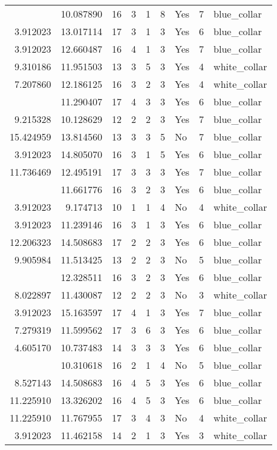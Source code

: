 \documentclass[
]{article}
\begin{document}
\begin{longtable}[t]{rrrrrllrl}
\addlinespace
3.912023 & 10.087890 & 16 & 3 & 1 & 8 & Yes & 7 & blue\_collar\\
3.912023 & 13.017114 & 17 & 3 & 1 & 3 & Yes & 6 & blue\_collar\\
3.912023 & 12.660487 & 16 & 4 & 1 & 3 & Yes & 7 & blue\_collar\\
9.310186 & 11.951503 & 13 & 3 & 5 & 3 & Yes & 4 & white\_collar\\
7.207860 & 12.186125 & 16 & 3 & 2 & 3 & Yes & 4 & white\_collar\\
\addlinespace
8.022897 & 11.290407 & 17 & 4 & 3 & 3 & Yes & 6 & blue\_collar\\
9.215328 & 10.128629 & 12 & 2 & 2 & 3 & Yes & 7 & blue\_collar\\
15.424959 & 13.814560 & 13 & 3 & 3 & 5 & No & 7 & blue\_collar\\
3.912023 & 14.805070 & 16 & 3 & 1 & 5 & Yes & 6 & blue\_collar\\
11.736469 & 12.495191 & 17 & 3 & 3 & 3 & Yes & 7 & blue\_collar\\
\addlinespace
5.521461 & 11.661776 & 16 & 3 & 2 & 3 & Yes & 6 & blue\_collar\\
3.912023 & 9.174713 & 10 & 1 & 1 & 4 & No & 4 & white\_collar\\
3.912023 & 11.239146 & 16 & 3 & 1 & 3 & Yes & 6 & blue\_collar\\
12.206323 & 14.508683 & 17 & 2 & 2 & 3 & Yes & 6 & blue\_collar\\
9.905984 & 11.513425 & 13 & 2 & 2 & 3 & No & 5 & blue\_collar\\
\addlinespace
11.002933 & 12.328511 & 16 & 3 & 2 & 3 & Yes & 6 & blue\_collar\\
8.022897 & 11.430087 & 12 & 2 & 2 & 3 & No & 3 & white\_collar\\
3.912023 & 15.163597 & 17 & 4 & 1 & 3 & Yes & 7 & blue\_collar\\
7.279319 & 11.599562 & 17 & 3 & 6 & 3 & Yes & 6 & blue\_collar\\
4.605170 & 10.737483 & 14 & 3 & 3 & 3 & Yes & 6 & blue\_collar\\
\addlinespace
3.912023 & 10.310618 & 16 & 2 & 1 & 4 & No & 5 & blue\_collar\\
8.527143 & 14.508683 & 16 & 4 & 5 & 3 & Yes & 6 & blue\_collar\\
11.225910 & 13.326202 & 16 & 4 & 5 & 3 & Yes & 6 & blue\_collar\\
11.225910 & 11.767955 & 17 & 3 & 4 & 3 & No & 4 & white\_collar\\
3.912023 & 11.462158 & 14 & 2 & 1 & 3 & Yes & 3 & white\_collar\\

\end{longtable}
\end{document}
